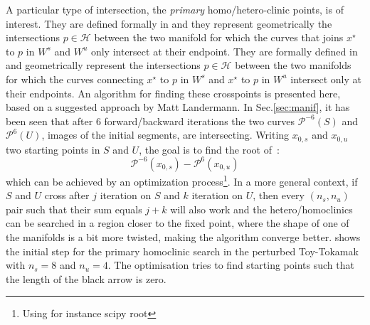 A particular type of intersection, the \textit{primary} homo/hetero-clinic points, is of interest. They are defined formally in \cite[p.14]{hohloch_homoclinic_2017} and they represent geometrically the intersections $p\in\mathcal{H}$ between the two manifold for which the curves that joins $x^\star$ to $p$ in $W^s$ and $W^u$ only intersect at their endpoint. They are formally defined in \cite[p.14]{hohloch_homoclinic_2017} and geometrically represent the intersections $p\in\mathcal{H}$ between the two manifolds for which the curves connecting $x^\star$ to $p$ in $W^s$ and $x^\star$ to $p$ in $W^u$ intersect only at their endpoints. An algorithm for finding these crosspoints is presented here, based on a suggested approach by Matt Landermann. In Sec.\ref{sec:manif}, it has been seen that after $6$ forward/backward iterations the two curves $\mathcal{P}^{-6}(S)$ and $\mathcal{P}^{6}(U)$, images of the initial segments, are intersecting. Writing $x_{0,s}$ and $x_{0,u}$ two starting points in $S$ and $U$, the goal is to find the root of~:
\begin{equation*}
    \mathcal{P}^{-6}(x_{0,s}) - \mathcal{P}^{6}(x_{0,u})
\end{equation*}
which can be achieved by an optimization process\footnote{Using for instance scipy root}. In a more general context, if $S$ and $U$ cross after $j$ iteration on $S$ and $k$ iteration on $U$, then every $(n_s, n_u)$ pair such that their sum equals $j+k$ will also work and the hetero/homoclinics can be searched in a region closer to the fixed point, where the shape of one of the manifolds is a bit more twisted, making the algorithm converge better.  shows the initial step for the primary homoclinic search in the perturbed Toy-Tokamak with $n_s = 8$ and $n_u = 4$. The optimisation tries to find starting points such that the length of the black arrow is zero.
